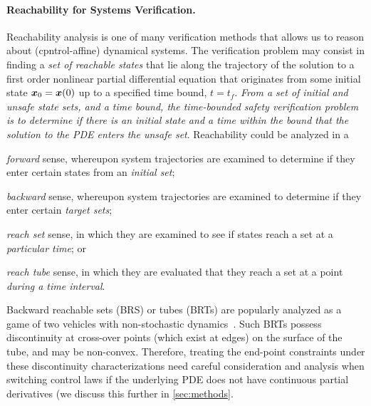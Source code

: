 \paragraph{Reachability for Systems Verification.}
Reachability analysis is one of many verification methods that allows us to reason about (cpntrol-affine) dynamical systems. 
The verification problem may consist in finding a \textit{set of reachable states} that lie along the trajectory of the solution to a first order nonlinear partial differential equation that originates from some initial state $\bm{x}_0 = \bm{x}(0)$ up to a specified time bound, $t=t_f$. 
\textit{From a set of initial and unsafe state sets, and a time bound, the time-bounded safety verification problem is to determine if there is an initial state and a time within the bound that the solution to the PDE enters the unsafe set}.
Reachability could be analyzed in a 
%
\begin{inparaenum}[(i)]
	\item \textit{forward} sense, whereupon system trajectories are examined to determine if they enter certain states from an \textit{initial set};
	\item \textit{backward} sense, whereupon system trajectories are examined to determine if they enter certain \textit{target sets};
	\item \textit{reach set} sense, in which they are examined to see if states reach a set at a \textit{particular time}; or
	\item \textit{reach tube} sense, in which they are evaluated that they reach a set at a point \textit{during a time interval}.	
\end{inparaenum} 

Backward reachable sets (BRS) or tubes (BRTs) are popularly analyzed as a game of two vehicles with non-stochastic dynamics~\cite{Merz1972}. 
Such BRTs possess discontinuity at cross-over points (which exist at edges) on the surface of the  tube, and may be non-convex. 
Therefore, treating the end-point constraints under these discontinuity characterizations need careful consideration and analysis when switching control laws if the underlying PDE does not have continuous partial  derivatives (we discuss this further in \autoref{sec:methods}. 

